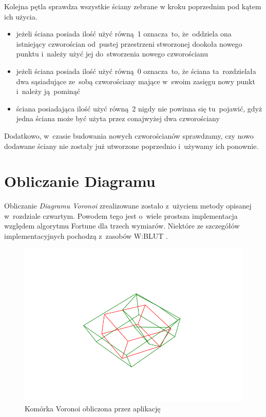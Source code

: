 \documentclass[skorowidz,autorrok,backref,xodstep,oswiadczenie]{wmimgr}
\begin{document}
Kolejna pętla sprawdza wszystkie ściany zebrane w kroku poprzednim pod kątem ich użycia.
\begin{itemize}
\item
jeżeli ściana posiada ilość użyć równą~1 oznacza~to, że~oddziela ona istniejący czworościan od~pustej przestrzeni stworzonej dookoła nowego punktu i~należy użyć jej do~stworzenia nowego czworościanu
\item
jeżeli ściana posiada ilość użyć równą~0 oznacza~to, że ściana ta~rozdzielała dwa sąsiadujące ze~sobą czworościany mające w~swoim zasięgu nowy punkt i~należy ją~pominąć
\item
ściana posiadająca ilość użyć równą~2 nigdy nie powinna się tu~pojawić, gdyż jedna ściana może być użyta przez conajwyżej dwa czworościany
\end{itemize}

Dodatkowo, w~czasie budowania nowych czworościanów sprawdzamy, czy nowo dodawane ściany nie zostały już utworzone poprzednio i~używamy ich ponownie.

\section{Obliczanie Diagramu}

Obliczanie \emph{Diagramu Voronoi} zrealizowane zostało z~użyciem metody opisanej w~rozdziale czwartym. Powodem tego jest o~wiele prostsza implementacja względem algorytmu Fortune dla trzech wymiarów. Niektóre ze szczegółów implementacyjnych pochodzą z~zasobów W:BLUT \cite{fvan}.

\begin{figure}[ht!]
\centering
\includegraphics[width=140mm]{images/app2_1.png}
\caption{Komórka Voronoi obliczona przez aplikację}
\label{appcell}
\end{figure}
\end{document}
